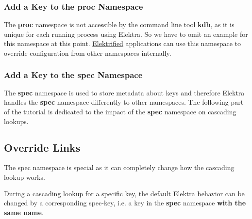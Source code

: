 

\subsubsection*{Add a Key to the proc Namespace}

The {\bfseries proc} namespace is not accessible by the command line tool {\bfseries kdb}, as it is unique for each running process using Elektra. So we have to omit an example for this namespace at this point. \hyperlink{md_doc_help_elektra-glossary_doc_help_elektra-glossary_md}{Elektrified} applications can use this namespace to override configuration from other namespaces internally.

\subsubsection*{Add a Key to the spec Namespace}

The {\bfseries spec} namespace is used to store metadata about keys and therefore Elektra handles the {\bfseries spec} namespace differently to other namespaces. The following part of the tutorial is dedicated to the impact of the {\bfseries spec} namespace on cascading lookups.

\subsection*{Override Links}

The {\ttfamily spec} namespace is special as it can completely change how the cascading lookup works.

During a cascading lookup for a specific key, the default Elektra behavior can be changed by a corresponding {\ttfamily spec-\/key}, i.\+e. a key in the {\bfseries spec} namespace {\bfseries with the same name}.

